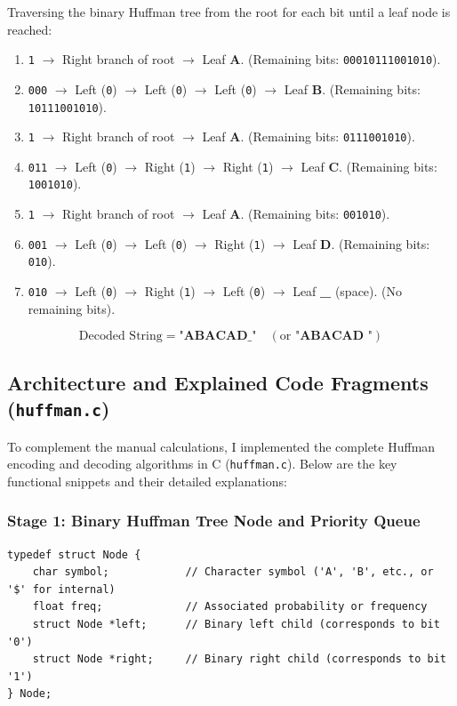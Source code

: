 \documentclass[11pt,a4paper]{article}
\begin{document}
Traversing the binary Huffman tree from the root for each bit until a leaf node is reached:
\begin{enumerate}
    \item \texttt{1} $\rightarrow$ Right branch of root $\rightarrow$ Leaf \textbf{A}. (Remaining bits: \texttt{00010111001010}).
    \item \texttt{000} $\rightarrow$ Left (\texttt{0}) $\rightarrow$ Left (\texttt{0}) $\rightarrow$ Left (\texttt{0}) $\rightarrow$ Leaf \textbf{B}. (Remaining bits: \texttt{10111001010}).
    \item \texttt{1} $\rightarrow$ Right branch of root $\rightarrow$ Leaf \textbf{A}. (Remaining bits: \texttt{0111001010}).
    \item \texttt{011} $\rightarrow$ Left (\texttt{0}) $\rightarrow$ Right (\texttt{1}) $\rightarrow$ Right (\texttt{1}) $\rightarrow$ Leaf \textbf{C}. (Remaining bits: \texttt{1001010}).
    \item \texttt{1} $\rightarrow$ Right branch of root $\rightarrow$ Leaf \textbf{A}. (Remaining bits: \texttt{001010}).
    \item \texttt{001} $\rightarrow$ Left (\texttt{0}) $\rightarrow$ Left (\texttt{0}) $\rightarrow$ Right (\texttt{1}) $\rightarrow$ Leaf \textbf{D}. (Remaining bits: \texttt{010}).
    \item \texttt{010} $\rightarrow$ Left (\texttt{0}) $\rightarrow$ Right (\texttt{1}) $\rightarrow$ Left (\texttt{0}) $\rightarrow$ Leaf \textbf{\_} (space). (No remaining bits).
\end{enumerate}

\begin{equation}
    \text{Decoded String} = \mathbf{\text{"ABACAD\_"}} \quad (\text{or } \mathbf{\text{"ABACAD "}})
\end{equation}

\subsection{Architecture and Explained Code Fragments (\texttt{huffman.c})}
To complement the manual calculations, I implemented the complete Huffman encoding and decoding algorithms in C (\texttt{huffman.c}). Below are the key functional snippets and their detailed explanations:

\subsubsection{Stage 1: Binary Huffman Tree Node and Priority Queue}
\begin{lstlisting}[style=cstyle, caption={Huffman binary tree node definition}]
typedef struct Node {
    char symbol;            // Character symbol ('A', 'B', etc., or '$' for internal)
    float freq;             // Associated probability or frequency
    struct Node *left;      // Binary left child (corresponds to bit '0')
    struct Node *right;     // Binary right child (corresponds to bit '1')
} Node;
\end{lstlisting}
\end{document}

